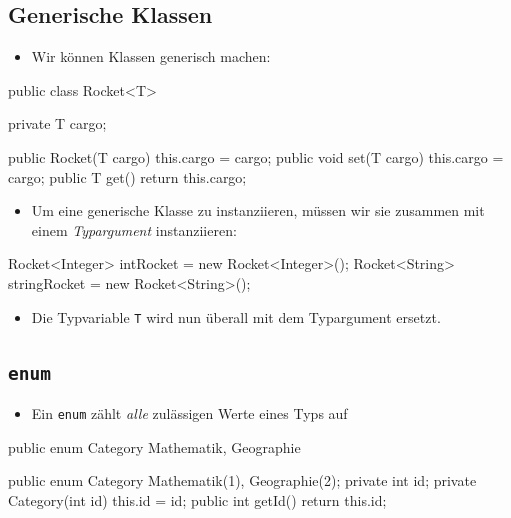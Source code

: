 \documentclass[a4paper,10pt, dvipsnames]{report}
\newcommand{\javaInLine}[1]{\texttt{#1}}
\begin{document}
\subsection{Generische Klassen}

\begin{itemize}
    \item Wir können Klassen generisch machen:
\end{itemize}

\begin{javacodebox}
public class Rocket<T> {

    private T cargo;

    public Rocket(T cargo) {
        this.cargo = cargo;
    }
    public void set(T cargo) {
        this.cargo = cargo;
    }
    public T get() {
        return this.cargo;
    }
}
\end{javacodebox}


\begin{itemize}
	\item Um eine generische Klasse zu instanziieren, müssen wir sie zusammen mit einem \textit{Typargument} instanziieren:
\end{itemize}

\begin{javacodebox}
    Rocket<Integer> intRocket = new Rocket<Integer>();
    Rocket<String> stringRocket = new Rocket<String>();
\end{javacodebox} 

\begin{itemize}
	\item Die Typvariable \javaInLine{T} wird nun überall mit dem Typargument ersetzt.
\end{itemize}



\subsection{\javaInLine{enum}}

\begin{itemize}
    \item Ein \javaInLine{enum} zählt \textit{alle} zulässigen Werte eines Typs auf
\end{itemize}

\begin{javacodebox}
    public enum Category {
        Mathematik, Geographie
    }
\end{javacodebox}

\begin{javacodebox}
    public enum Category {
        Mathematik(1), Geographie(2);
        private int id;
        private Category(int id) {
            this.id = id;
        }
        public int getId() {
            return this.id;
        }
    }
\end{javacodebox}
\end{document}
